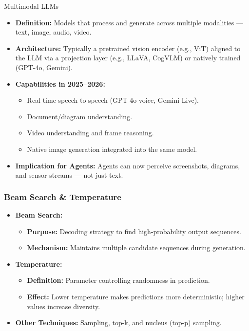 \documentclass{beamer}       %
\begin{document}
\begin{frame}{Multimodal LLMs}
    \begin{itemize}
        \item \textbf{Definition:} Models that process and generate across multiple modalities --- text, image, audio, video.
        \item \textbf{Architecture:} Typically a pretrained vision encoder (e.g., ViT) aligned to the LLM via a projection layer (e.g., LLaVA, CogVLM) or natively trained (GPT-4o, Gemini).
        \item \textbf{Capabilities in 2025--2026:}
            \begin{itemize}
                \item Real-time speech-to-speech (GPT-4o voice, Gemini Live).
                \item Document/diagram understanding.
                \item Video understanding and frame reasoning.
                \item Native image generation integrated into the same model.
            \end{itemize}
        \item \textbf{Implication for Agents:} Agents can now perceive screenshots, diagrams, and sensor streams --- not just text.
    \end{itemize}
\end{frame}

\begin{frame}
\frametitle{Beam Search \& Temperature}
\begin{itemize}
    \item \textbf{Beam Search:}
    \begin{itemize}
        \item \textbf{Purpose:} Decoding strategy to find high-probability output sequences.
        \item \textbf{Mechanism:} Maintains multiple candidate sequences during generation.
    \end{itemize}
    \item \textbf{Temperature:}
    \begin{itemize}
        \item \textbf{Definition:} Parameter controlling randomness in prediction.
        \item \textbf{Effect:} Lower temperature makes predictions more deterministic; higher values increase diversity.
    \end{itemize}
    \item \textbf{Other Techniques:} Sampling, top-k, and nucleus (top-p) sampling.
\end{itemize}
\end{frame}
\end{document}

